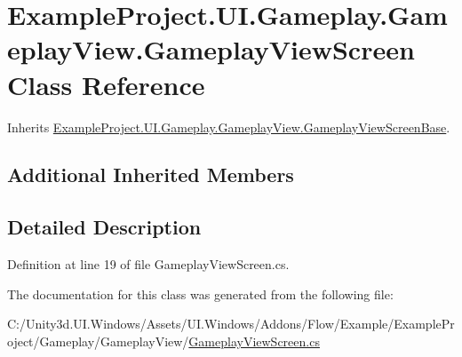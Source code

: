 \hypertarget{class_example_project_1_1_u_i_1_1_gameplay_1_1_gameplay_view_1_1_gameplay_view_screen}{}\section{Example\+Project.\+U\+I.\+Gameplay.\+Gameplay\+View.\+Gameplay\+View\+Screen Class Reference}
\label{class_example_project_1_1_u_i_1_1_gameplay_1_1_gameplay_view_1_1_gameplay_view_screen}


Inherits \hyperlink{class_example_project_1_1_u_i_1_1_gameplay_1_1_gameplay_view_1_1_gameplay_view_screen_base}{Example\+Project.\+U\+I.\+Gameplay.\+Gameplay\+View.\+Gameplay\+View\+Screen\+Base}.

\subsection*{Additional Inherited Members}


\subsection{Detailed Description}


Definition at line 19 of file Gameplay\+View\+Screen.\+cs.



The documentation for this class was generated from the following file\+:\begin{DoxyCompactItemize}
\item 
C\+:/\+Unity3d.\+U\+I.\+Windows/\+Assets/\+U\+I.\+Windows/\+Addons/\+Flow/\+Example/\+Example\+Project/\+Gameplay/\+Gameplay\+View/\hyperlink{_gameplay_view_screen_8cs}{Gameplay\+View\+Screen.\+cs}\end{DoxyCompactItemize}
